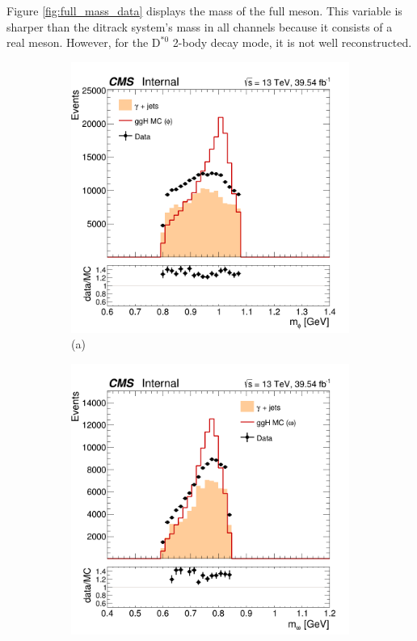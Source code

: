 Figure \ref{fig:full_mass_data} displays the mass of the full meson. This variable is sharper than the ditrack system's mass in all channels because it consists of a real meson. However, for the $\text{D}^{*0}$ 2-body decay mode, it is not well reconstructed.
\begin{figure}[!ht]
    \captionsetup[subfigure]{labelformat=empty}
    \vspace*{-0.2cm}
    \centering
    \setlength{\mylength}{\textwidth}
    \begin{subfigure}[t]{0.50\mylength}
        \centering
        \includegraphics[width=0.49\mylength]{resources/plots/Phi3_mass.png}
        \vspace*{-0.2cm}
        \caption{\footnotesize (a)}
    \end{subfigure}%
    \begin{subfigure}[t]{0.50\mylength}
        \centering
        \includegraphics[width=0.49\mylength]{resources/plots/Omega_mass.png}

\end{subfigure}
\end{figure}
